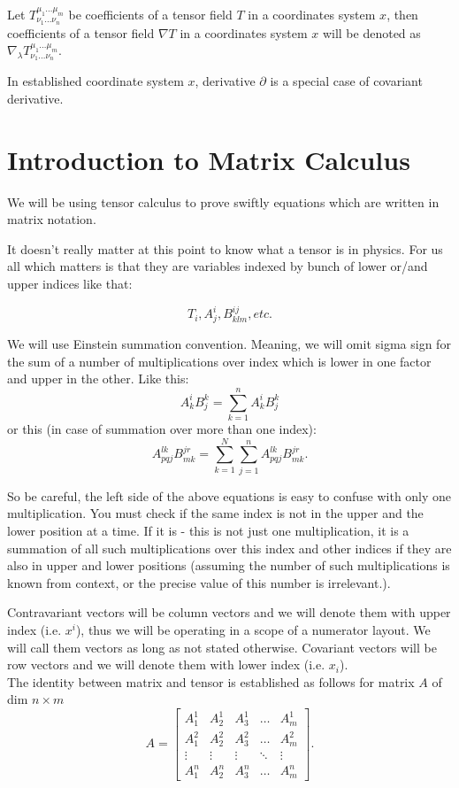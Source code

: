 \documentclass[main.tex]{subfiles}
\begin{document}
\begin{definition}
Let $T^{\mu_1\dots\mu_m}_{\nu_1\dots\nu_n}$ be coefficients of a tensor field $T$ in a coordinates system $x$, then coefficients of a tensor field $\nabla T$ in a coordinates system $x$ will be denoted as $\nabla_\lambda T^{\mu_1\dots\mu_m}_{\nu_1\dots\nu_n}$.
\end{definition}  

\begin{remark}
In established coordinate system $x$, derivative $\partial$ is a special case of covariant derivative. 
\end{remark}
\section{Introduction to Matrix Calculus}
We will be using tensor calculus to prove swiftly equations which are written in matrix notation. 

It doesn't really matter at this point to know what a tensor is in physics. For us all which matters is that they are variables indexed by bunch of lower or/and upper indices like that:

$$
T_i, A^i_j, B^{ij}_{klm}, etc.
$$


We will use Einstein summation convention. Meaning, we will omit sigma sign for the sum of a number of multiplications over index which is lower in one factor and upper in the other. Like this:
$$
A^i_k B^k_j = \sum_{k = 1}^n A^i_k B^k_j
$$
or this (in case of summation over more than one index):
$$
A_{pqj}^{lk}B^{jr}_{mk} = \sum_{k = 1}^N\sum_{j = 1}^n A_{pqj}^{lk}B^{jr}_{mk}.
$$

So be careful, the left side of the above equations is easy to confuse with only one multiplication. You must check if the same index is not in the upper and the lower position at a time. If it is - this is not just one multiplication, it is a summation of all such multiplications over this index and other indices if they are also in upper and lower positions (assuming the number of such multiplications is known from context, or the precise value of this number is irrelevant.).

Contravariant vectors will be column vectors and we will denote them with upper index (i.e. $x^i$), thus
we will be operating in a scope of a numerator layout. We will call them vectors as long as not stated otherwise. Covariant vectors will be row vectors and we will denote them with lower index (i.e. $x_i$).\\
The identity between matrix and tensor is established as follows for matrix $A$ of dim $n \times m$
\begin{equation}
A = \begin{bmatrix}
    A^1_1 & A^1_2 & A^1_3 & \dots  & A^1_m \\
    A^2_1 & A^2_2 & A^2_3 & \dots  & A^2_m \\
    \vdots & \vdots & \vdots & \ddots & \vdots \\
    A^n_1 & A^n_2 & A^n_3 & \dots  & A^n_m
\end{bmatrix}.
\end{equation}
\end{document}
